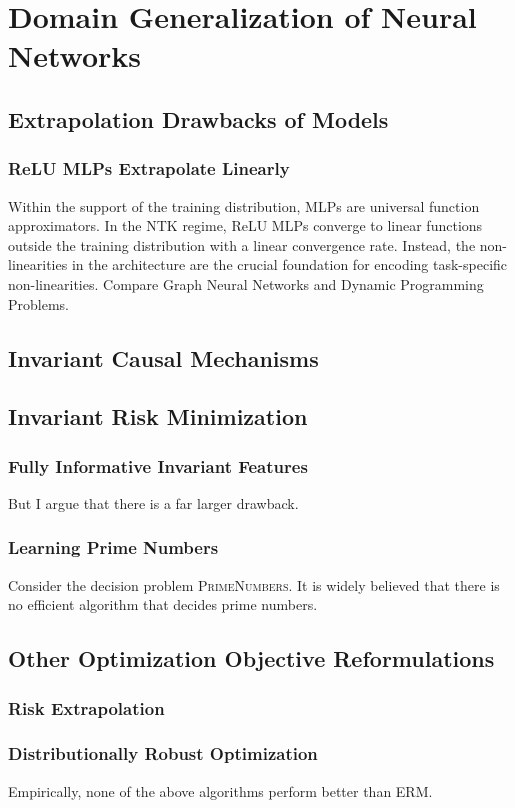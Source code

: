 

\chapter{Domain Generalization of Neural Networks}
\section{Extrapolation Drawbacks of Models}
\subsection{ReLU MLPs Extrapolate Linearly}
Within the support of the training distribution, MLPs are universal function approximators.
In the NTK regime, ReLU MLPs converge to linear functions outside the training distribution with a linear convergence rate.
Instead, the non-linearities in the architecture are the crucial foundation for encoding task-specific non-linearities. Compare Graph Neural Networks and Dynamic Programming Problems.

\section{Invariant Causal Mechanisms}
\section{Invariant Risk Minimization}

\subsection{Fully Informative Invariant Features}
But I argue that there is a far larger drawback.
\subsection{Learning Prime Numbers}
Consider the decision problem \textsc{PrimeNumbers}.
It is widely believed that there is no efficient algorithm that decides prime numbers.

\section{Other Optimization Objective Reformulations}
\subsection{Risk Extrapolation}
\subsection{Distributionally Robust Optimization}


Empirically, none of the above algorithms perform better than ERM.
